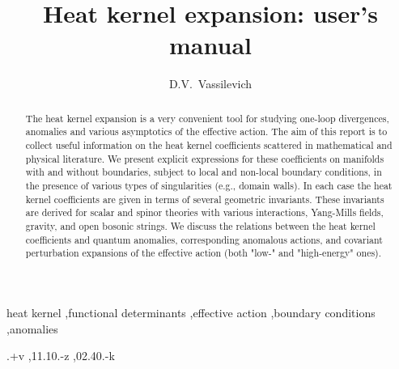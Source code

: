 \documentclass{elsart}
\numberwithin{equation}{section}
\numberwithin{figure}{section}
\begin{document}

\begin{frontmatter}
 
\title{Heat kernel expansion: user's manual}

\author[Leipzig,SPb]{D.V.\ Vassilevich}

\address[Leipzig]{Institut f\"ur Theoretische Physik, Universit\"at Leipzig,
                 Augustusplatz 10, D-04109 Leipzig, Germany}
\address[SPb]{V.A.\ Fock Insitute of Physics, St. Petersburg University, 198904
St.\ Petersburg, Russia}

\begin{abstract}
The heat kernel expansion is a very convenient tool for studying
one-loop divergences, anomalies and various asymptotics of the
effective action. The aim of this report is to collect useful
information on the heat kernel coefficients scattered in
mathematical and physical literature. We present explicit
expressions for these coefficients on manifolds with and without
boundaries, subject to local and non-local boundary conditions, in
the presence of various types of singularities (e.g., domain
walls). In each case the heat kernel coefficients are given in
terms of several geometric invariants. These invariants are
derived for scalar and spinor theories with various interactions,
Yang-Mills fields, gravity, and open bosonic strings. We discuss
the relations between the heat kernel coefficients  and quantum
anomalies, corresponding anomalous actions, and covariant
perturbation expansions of the effective action (both "low-" and
"high-energy" ones).
\end{abstract}

\begin{keyword}
heat kernel \sep functional determinants \sep effective action
\sep boundary conditions \sep anomalies

.+v \sep 11.10.-z \sep 02.40.-k
\end{keyword}
\end{frontmatter}

\newpage
\thispagestyle{plain}
\tableofcontents


\newpage












\end{document}
